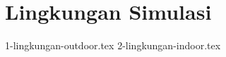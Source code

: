 \section{Lingkungan Simulasi}
\label{sec:lingkungansimulasi}

\textcolor{red}{\lipsum[1-2]}

{1-lingkungan-outdoor.tex}
{2-lingkungan-indoor.tex}
